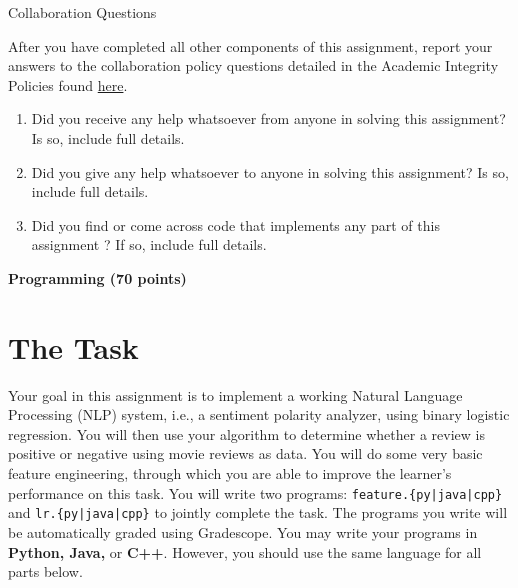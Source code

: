 \documentclass[11pt,addpoints,answers]{exam}
\begin{document}
\begin{questions}
\begin{parts}
\begin{your_solution}[height=8.5cm]
\begin{center}
\end{center}
\end{your_solution}


\newpage
\end{parts}

{\Large Collaboration Questions}

After you have completed all other components of this assignment, report your answers to the collaboration policy questions detailed in the Academic Integrity Policies found \href{http://www.cs.cmu.edu/~mgormley/courses/10601/about.html#7-academic-integrity-policies}{here}.
\begin{enumerate}
    \item Did you receive any help whatsoever from anyone in solving this assignment? Is so, include full details.
    \item Did you give any help whatsoever to anyone in solving this assignment? Is so, include full details.
    \item Did you find or come across code that implements any part of this assignment ? If so, include full details.
\end{enumerate}

\begin{your_solution}[height=6cm]

\end{your_solution}

\newpage
\end{questions}

{\LARGE \bf Programming (70 points)}

\section{The Task}\label{task}

Your goal in this assignment is to implement a working Natural Language Processing (NLP) system, i.e., a sentiment polarity analyzer, using binary logistic regression. You will then use your algorithm to determine whether a review is positive or negative using movie reviews as data. You will do some very basic feature engineering, through which you are able to improve the learner's performance on this task. You will write two programs: \texttt{feature.\{py|java|cpp\}} and \texttt{lr.\{py|java|cpp\}} to jointly complete the task. The programs you write will be automatically graded using Gradescope. You may write your programs in {\bf Python, Java,} or {\bf C++}. However, you should use the same language for all parts below.
\end{document}
